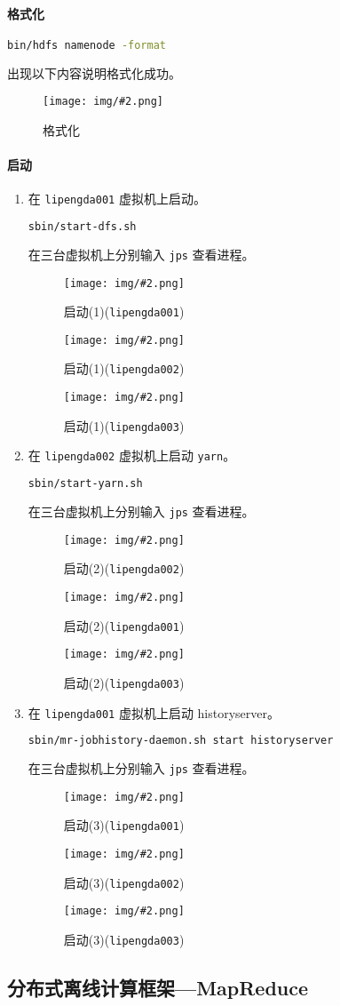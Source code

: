 \documentclass{article}
\newenvironment{enum}{
    \begin{enumerate}[label=(\arabic*), noitemsep]
}{
    \end{enumerate}
}
\newcommand{\img}[3][0.9]{%
    \begin{figure}[H]
        \centering
        \texttt{[image: img/\#2.png]}
        \caption{#3}
    \end{figure}
}
\newcommand{\subsubsubsection}[1]{\paragraph{#1}\mbox{}}
\begin{document}
\subsubsubsection{格式化}

\begin{lstlisting}[language=bash]
    bin/hdfs namenode -format
\end{lstlisting}

出现以下内容说明格式化成功。

\img{7.2.2.1}{格式化}

\subsubsubsection{启动}

\begin{enum}
    \item 在 \texttt{lipengda001} 虚拟机上启动。
    
    \begin{lstlisting}[language=bash]
    sbin/start-dfs.sh
    \end{lstlisting}

    在三台虚拟机上分别输入 \texttt{jps} 查看进程。

    \img{7.2.3.1}{启动(1)(\texttt{lipengda001})}
    \img{7.2.3.2}{启动(1)(\texttt{lipengda002})}
    \img{7.2.3.3}{启动(1)(\texttt{lipengda003})}

    \item 在 \texttt{lipengda002} 虚拟机上启动 \texttt{yarn}。
    
    \begin{lstlisting}[language=bash]
    sbin/start-yarn.sh
    \end{lstlisting}

    在三台虚拟机上分别输入 \texttt{jps} 查看进程。

    \img{7.2.3.4}{启动(2)(\texttt{lipengda002})}
    \img{7.2.3.5}{启动(2)(\texttt{lipengda001})}
    \img{7.2.3.6}{启动(2)(\texttt{lipengda003})}

    
    \item 在 \texttt{lipengda001} 虚拟机上启动 historyserver。
    
    \begin{lstlisting}[language=bash]
    sbin/mr-jobhistory-daemon.sh start historyserver
    \end{lstlisting}

    在三台虚拟机上分别输入 \texttt{jps} 查看进程。

    \img{7.2.3.7}{启动(3)(\texttt{lipengda001})}
    \img{7.2.3.8}{启动(3)(\texttt{lipengda002})}
    \img{7.2.3.9}{启动(3)(\texttt{lipengda003})}
\end{enum}

\subsection{分布式离线计算框架---MapReduce}
\end{document}
